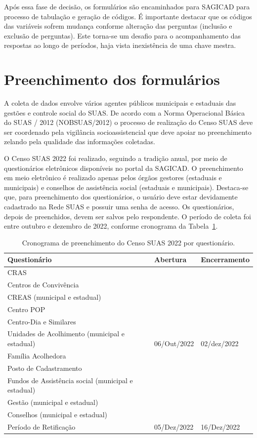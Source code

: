 \documentclass[
  letterpaper,
  DIV=11,
  numbers=noendperiod]{scrreprt}
\begin{document}
Após essa fase de decisão, os formulários são encaminhados para SAGICAD
para processo de tabulação e geração de códigos. É importante destacar
que os códigos das variáveis sofrem mudança conforme alteração das
perguntas (inclusão e exclusão de perguntas). Este torna-se um desafio
para o acompanhamento das respostas ao longo de períodos, haja vista
inexistência de uma chave mestra.

\section{Preenchimento dos
formulários}\label{preenchimento-dos-formuluxe1rios}

A coleta de dados envolve vários agentes públicos municipais e estaduais
das gestões e controle social do SUAS. De acordo com a Norma Operacional
Básica do SUAS / 2012 (NOBSUAS/2012) o processo de realização do Censo
SUAS deve ser coordenado pela vigilância socioassistencial que deve
apoiar no preenchimento zelando pela qualidade das informações
coletadas.

O Censo SUAS 2022 foi realizado, seguindo a tradição anual, por meio de
questionários eletrônicos disponíveis no portal da SAGICAD. O
preenchimento em meio eletrônico é realizado apenas pelos órgãos
gestores (estaduais e municipais) e conselhos de assistência social
(estaduais e municipais). Destaca-se que, para preenchimento dos
questionários, o usuário deve estar devidamente cadastrado na Rede SUAS
e possuir uma senha de acesso. Os questionários, depois de preenchidos,
devem ser salvos pelo respondente. O período de coleta foi entre outubro
e dezembro de 2022, conforme cronograma da Tabela~\ref{tbl-cronograma}.

\begin{longtable}[]{@{}lll@{}}

\caption{\label{tbl-cronograma}Cronograma de preenchimento do Censo SUAS
2022 por questionário.}

\tabularnewline

\toprule\noalign{}
Questionário & Abertura & Encerramento \\
\midrule\noalign{}
\endhead
\bottomrule\noalign{}
\endlastfoot
CRAS & \multirow{11}{=}{06/Out/2022} & \multirow{11}{=}{02/dez/2022} \\
Centros de Convivência \\
CREAS (municipal e estadual) \\
Centro POP \\
Centro-Dia e Similares \\
Unidades de Acolhimento (municipal e estadual) \\
Família Acolhedora \\
Posto de Cadastramento \\
Fundos de Assistência social (municipal e estadual) \\
Gestão (municipal e estadual) \\
Conselhos (municipal e estadual) \\
Período de Retificação & 05/Dez/2022 & 16/Dez/2022 \\

\end{longtable}
\end{document}
